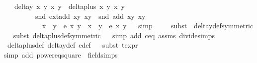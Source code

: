 \begin{isabellebody}
\ \ \ {\isachardoublequoteopen}delta{\isacharunderscore}y\ x{}\ y{}\ x{}\ y{}\ {\isacharasterisk}\ delta{\isacharunderscore}plus\ x{}\ y{}\ x{}\ y{}\ {\isacharasterisk}\isanewline
\ \ \ \ \ \ \ \ \ {\isacharparenleft}snd\ {\isacharparenleft}ext{\isacharunderscore}add\ {\isacharparenleft}x{}{\isacharcomma}y{}{\isacharparenright}\ {\isacharparenleft}x{}{\isacharcomma}y{}{\isacharparenright}{\isacharparenright}\ {\isacharminus}\ snd\ {\isacharparenleft}add\ {\isacharparenleft}x{}{\isacharcomma}y{}{\isacharparenright}\ {\isacharparenleft}x{}{\isacharcomma}y{}{\isacharparenright}{\isacharparenright}{\isacharparenright}\isanewline
\ \ \ \ \ \ \ \ \ {\isacharequal}\ {\isacharminus}\ x{}\ {\isacharasterisk}\ y{}\ {\isacharasterisk}\ e{\isacharprime}\ x{}\ y{}\ {\isacharminus}\ x{}\ {\isacharasterisk}\ y{}\ {\isacharasterisk}\ e{\isacharprime}\ x{}\ y{}{\isachardoublequoteclose}\isanewline
%
\isadelimproof
\ \ %
\endisadelimproof
%
\isatagproof
{}\isamarkupfalse%
{\isacharparenleft}simp{\isacharparenright}\ \ \isanewline
\ \ \isamarkupfalse%
{\isacharparenleft}subst\ {\isacharparenleft}{}{\isacharparenright}\ delta{\isacharunderscore}y{\isacharunderscore}def{\isacharbrackleft}symmetric{\isacharbrackright}{\isacharparenright}\isanewline
\ \ \isamarkupfalse%
{\isacharparenleft}subst\ delta{\isacharunderscore}plus{\isacharunderscore}def{\isacharbrackleft}symmetric{\isacharbrackright}{\isacharparenright}\isanewline
\ \ \isamarkupfalse%
{\isacharparenleft}simp\ add{\isacharcolon}\ c{\isacharunderscore}eq{\isacharunderscore}{}\ assms{\isacharparenleft}{}{\isacharcomma}{}{\isacharparenright}\ divide{\isacharunderscore}simps{\isacharparenright}\isanewline
\ \ \isamarkupfalse%
\ delta{\isacharunderscore}plus{\isacharunderscore}def\ delta{\isacharunderscore}y{\isacharunderscore}def\ e{\isacharprime}{\isacharunderscore}def\isanewline
\ \ \isamarkupfalse%
{\isacharparenleft}subst\ t{\isacharunderscore}expr{\isacharparenright}{\isacharplus}\isanewline
\ \ \isamarkupfalse%
{\isacharparenleft}simp\ add{\isacharcolon}\ power{}{\isacharunderscore}eq{\isacharunderscore}square\ \ field{\isacharunderscore}simps{\isacharparenright}%

\end{isabellebody}
